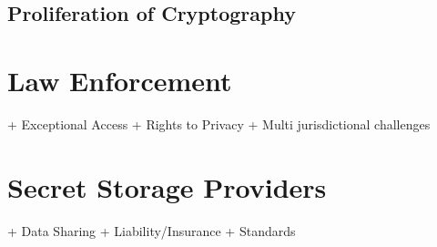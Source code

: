 \subsection{Proliferation of Cryptography}
\label{chap:policy:crypto:proliferation}


\section{Law Enforcement}
\label{chap:policy:leo}

+ Exceptional Access
+ Rights to Privacy
+ Multi jurisdictional challenges

\section{Secret Storage Providers}
\label{chap:policy:ssp}

+ Data Sharing
+ Liability/Insurance
+ Standards

